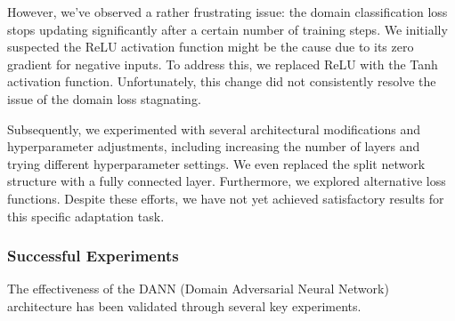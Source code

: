 \documentclass{article}
\begin{document}
However, we've observed a rather frustrating issue: the domain classification loss stops updating significantly after a certain number of training steps. We initially suspected the ReLU activation function might be the cause due to its zero gradient for negative inputs. To address this, we replaced ReLU with the Tanh activation function. Unfortunately, this change did not consistently resolve the issue of the domain loss stagnating.

Subsequently, we experimented with several architectural modifications and hyperparameter adjustments, including increasing the number of layers and trying different hyperparameter settings. We even replaced the split network structure with a fully connected layer. Furthermore, we explored alternative loss functions. Despite these efforts, we have not yet achieved satisfactory results for this specific adaptation task.

\subsubsection{Successful Experiments}
The effectiveness of the DANN (Domain Adversarial Neural Network) architecture has been validated through several key experiments.
\end{document}
